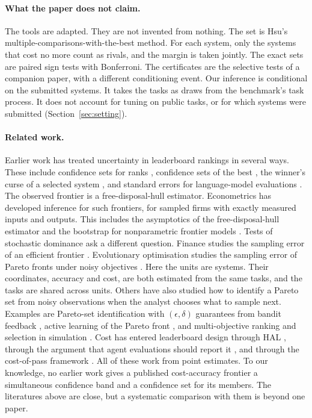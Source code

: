 \documentclass[11pt]{article}
\begin{document}
\paragraph{What the paper does not claim.}
The tools are adapted. They are not invented from nothing. The set is Hsu's multiple-comparisons-with-the-best method. For each system, only the systems that cost no more count as rivals, and the margin is taken jointly. The exact sets are paired sign tests with Bonferroni. The certificates are the selective tests of a companion paper, with a different conditioning event. Our inference is conditional on the submitted systems. It takes the tasks as draws from the benchmark's task process. It does not account for tuning on public tasks, or for which systems were submitted (Section~\ref{sec:setting}).

\paragraph{Related work.}
Earlier work has treated uncertainty in leaderboard rankings in several ways. These include confidence sets for ranks \citep{mogstad2024ranks,neuhof2026rankintervals,neuhof2026ranking}, confidence sets of the best \citep{hsu1981mcb,hansen2011mcs}, the winner's curse of a selected system \citep{andrews2024winners,bakshi2026winners}, and standard errors for language-model evaluations \citep{miller2024errorbars,bowyer2025clt,madaan2024variance}. The observed frontier is a free-disposal-hull estimator. Econometrics has developed inference for such frontiers, for sampled firms with exactly measured inputs and outputs. This includes the asymptotics of the free-disposal-hull estimator \citep{park2000fdh} and the bootstrap for nonparametric frontier models \citep{simar1998bootstrap,simar2000state}. Tests of stochastic dominance \citep{linton2005sd} ask a different question. Finance studies the sampling error of an efficient frontier \citep{brittenjones1999}. Evolutionary optimisation studies the sampling error of Pareto fronts under noisy objectives \citep{fieldsend2005noisy}. Here the units are systems. Their coordinates, accuracy and cost, are both estimated from the same tasks, and the tasks are shared across units. Others have also studied how to identify a Pareto set from noisy observations when the analyst chooses what to sample next. Examples are Pareto-set identification with $(\epsilon,\delta)$ guarantees from bandit feedback \citep{auer2016pareto}, active learning of the Pareto front \citep{zuluaga2013pal}, and multi-objective ranking and selection in simulation \citep{applegate2020mors}. Cost has entered leaderboard design through HAL \citep{kapoor2025hal}, through the argument that agent evaluations should report it \citep{kapoor2024agents}, and through the cost-of-pass framework \citep{erol2025costofpass}. All of these work from point estimates. To our knowledge, no earlier work gives a published cost-accuracy frontier a simultaneous confidence band and a confidence set for its members. The literatures above are close, but a systematic comparison with them is beyond one paper.
\end{document}
